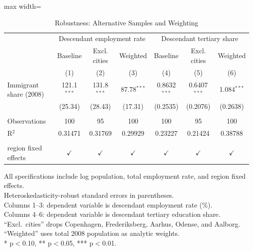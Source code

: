 \begin{table}[htbp]
   \caption{\label{tab:robustness} Robustness: Alternative Samples and Weighting}
   \bigskip
   \centering
   \begin{adjustbox}{max width=\textwidth}
   \begin{tabular}{lcccccc}
      \toprule
       & \multicolumn{3}{c}{Descendant employment rate} & \multicolumn{3}{c}{Descendant tertiary share}\\
                             & Baseline      & Excl. cities  & Weighted      & Baseline       & Excl. cities   & Weighted \\   
                             & (1)           & (2)           & (3)           & (4)            & (5)            & (6)\\  
      \midrule 
      Immigrant share (2008) & 121.1$^{***}$ & 131.8$^{***}$ & 87.78$^{***}$ & 0.8632$^{***}$ & 0.6407$^{***}$ & 1.084$^{***}$\\   
                             & (25.34)       & (28.43)       & (17.31)       & (0.2535)       & (0.2076)       & (0.2638)\\   
       \\
      Observations           & 100           & 95            & 100           & 100            & 95             & 100\\  
      R$^2$                  & 0.31471       & 0.31769       & 0.29929       & 0.23227        & 0.21424        & 0.38788\\  
       \\
      region fixed effects   & $\checkmark$  & $\checkmark$  & $\checkmark$  & $\checkmark$   & $\checkmark$   & $\checkmark$\\   
      \bottomrule
   \end{tabular}
   \end{adjustbox}

   \par \raggedright 
   All specifications include log population, total employment rate, and region fixed effects.\\
   Heteroskedasticity-robust standard errors in parentheses.\\
   Columns 1--3: dependent variable is descendant employment rate (\%).\\
   Columns 4--6: dependent variable is descendant tertiary education share.\\
   ``Excl.\ cities'' drops Copenhagen, Frederiksberg, Aarhus, Odense, and Aalborg.\\
   ``Weighted'' uses total 2008 population as analytic weights.\\
   * p$<$0.10, ** p$<$0.05, *** p$<$0.01.
\end{table}
